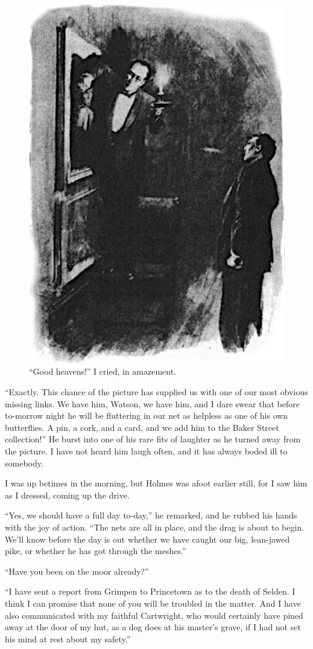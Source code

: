 \documentclass[paper=5.5in:8.5in,BCOR=7mm,twoside,DIV=calc,12pt,usegeometry,openany,chapterprefix,endperiod,headings=big]{scrbook} %
\begin{document}
\begin{figure}[tbh]
\centering
\includegraphics[width=.6\linewidth]{13_mirror}
\caption{\enquote{Good heavens!} I cried, in amazement.}
\end{figure}

\enquote{Exactly. This chance of the picture has supplied us with one of our most obvious missing links. We have him, Watson, we have him, and I dare swear that before to-morrow night he will be fluttering in our net as helpless as one of his own butterflies. A pin, a cork, and a card, and we add him to the Baker Street collection!} He burst into one of his rare fits of laughter as he turned away from the picture. I have not heard him laugh often, and it has always boded ill to somebody.

I was up betimes in the morning, but Holmes was afoot earlier still, for I saw him as I dressed, coming up the drive.

\enquote{Yes, we should have a full day to-day,} he remarked, and he rubbed his hands with the joy of action. \enquote{The nets are all in place, and the drag is about to begin. We'll know before the day is out whether we have caught our big, lean-jawed pike, or whether he has got through the meshes.}

\enquote{Have you been on the moor already?}

\enquote{I have sent a report from Grimpen to Princetown as to the death of Selden. I think I can promise that none of you will be troubled in the matter. And I have also communicated with my faithful Cartwright, who would certainly have pined away at the door of my hut, as a dog does at his master's grave, if I had not set his mind at rest about my safety.}
\end{document}
